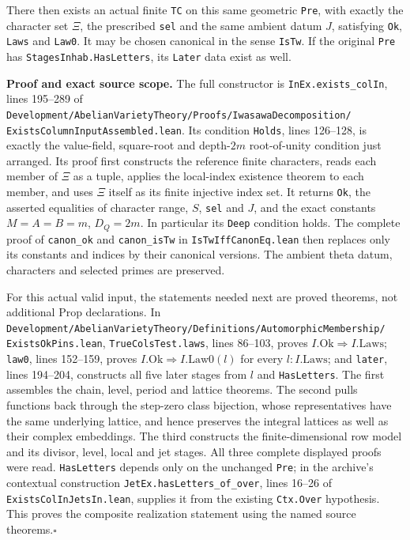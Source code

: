 There then exists an actual finite \texttt{TC} on this
same geometric \texttt{Pre}, with exactly the character
set $\Xi$, the prescribed \texttt{sel} and the same
ambient datum $J$, satisfying \texttt{Ok},
\texttt{Laws} and \texttt{Law0}.  It may be chosen
canonical in the sense \texttt{IsTw}.  If the original
\texttt{Pre} has \texttt{StagesInhab.HasLetters}, its
\texttt{Later} data exist as well.

\textbf{Proof and exact source scope.}
The full constructor is \texttt{InEx.exists\_colIn},
lines 195--289 of
\texttt{Development/AbelianVarietyTheory/Proofs/IwasawaDecomposition/}
\texttt{ExistsColumnInputAssembled.lean}.
Its condition \texttt{Holds}, lines 126--128, is exactly
the value-field, square-root and depth-$2m$ root-of-unity
condition just arranged.  Its proof first constructs
the reference finite characters, reads each member of
$\Xi$ as a tuple, applies the local-index existence
theorem to each member, and uses $\Xi$ itself as its
finite injective index set.  It returns \texttt{Ok},
the asserted equalities of character range, $S$,
\texttt{sel} and $J$, and the exact constants
$M=A=B=m$, $D_Q=2m$.
In particular its \texttt{Deep} condition holds.
The complete proof of \texttt{canon\_ok} and
\texttt{canon\_isTw} in \texttt{IsTwIffCanonEq.lean}
then replaces only its constants and indices by their
canonical versions.  The ambient theta datum,
characters and selected primes are preserved.

For this actual valid input, the statements needed next
are proved theorems, not additional Prop declarations.
In
\texttt{Development/AbelianVarietyTheory/Definitions/AutomorphicMembership/}
\texttt{ExistsOkPins.lean},
\texttt{TrueColsTest.laws}, lines 86--103, proves
$I.\mathrm{Ok}\Rightarrow I.\mathrm{Laws}$;
\texttt{law0}, lines 152--159, proves
$I.\mathrm{Ok}\Rightarrow I.\mathrm{Law0}(l)$ for
every $l:I.\mathrm{Laws}$; and \texttt{later},
lines 194--204, constructs all five later stages
from $l$ and \texttt{HasLetters}.
The first assembles the chain, level, period and lattice
theorems.  The second pulls functions back through the
step-zero class bijection, whose representatives have
the same underlying lattice, and hence preserves the
integral lattices as well as their complex embeddings.
The third constructs the finite-dimensional row model
and its divisor, level, local and jet stages.
All three complete displayed proofs were read.
\texttt{HasLetters} depends only on the unchanged
\texttt{Pre}; in the archive's contextual construction
\texttt{JetEx.hasLetters\_of\_over}, lines 16--26 of
\texttt{ExistsColInJetsIn.lean}, supplies it from
the existing \texttt{Ctx.Over} hypothesis.
This proves the composite realization statement using
the named source theorems.\hfill$\square$

